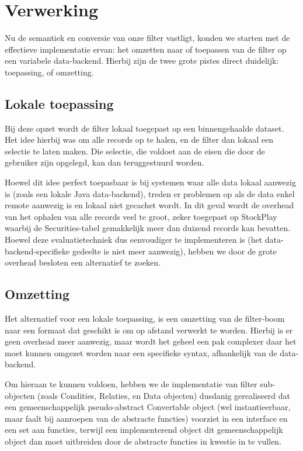 \section{Verwerking}

Nu de semantiek en conversie van onze filter vastligt, konden we starten met de effectieve implementatie ervan: het omzetten naar of toepassen van de filter op een variabele data-backend. Hierbij zijn de twee grote pistes direct duidelijk: toepassing, of omzetting.

\subsection{Lokale toepassing}

Bij deze opzet wordt de filter lokaal toegepast op een binnengehaalde dataset. Het idee hierbij was om alle records op te halen, en de filter dan lokaal een selectie te laten maken. Die selectie, die voldoet aan de eisen die door de gebruiker zijn opgelegd, kan dan teruggestuurd worden.

Hoewel dit idee perfect toepasbaar is bij systemen waar alle data lokaal aanwezig is (zoals een lokale Java data-backend), treden er problemen op als de data enkel remote aanwezig is en lokaal niet gecachet wordt. In dit geval wordt de overhead van het ophalen van alle records veel te groot, zeker toegepast op StockPlay waarbij de Securities-tabel gemakkelijk meer dan duizend records kan bevatten. Hoewel deze evaluatietechniek dus eenvoudiger te implementeren is (het data-backend-specifieke gedeelte is niet meer aanwezig), hebben we door de grote overhead besloten een alternatief te zoeken.

\subsection{Omzetting}

Het alternatief voor een lokale toepassing, is een omzetting van de filter-boom naar een formaat dat geschikt is om op afstand verwerkt te worden. Hierbij is er geen overhead meer aanwezig, maar wordt het geheel een pak complexer daar het moet kunnen omgezet worden naar een specifieke syntax, afhankelijk van de data-backend.

Om hieraan te kunnen voldoen, hebben we de implementatie van filter sub-objecten (zoals Condities, Relaties, en Data objecten) dusdanig gerealiseerd dat een gemeenschappelijk pseudo-abstract Convertable object (wel instantieerbaar, maar faalt bij aanroepen van de abstracte functies) voorziet in een interface en een set aan functies, terwijl een implementerend object dit gemeenschappelijk object dan moet uitbreiden door de abstracte functies in kwestie in te vullen.

